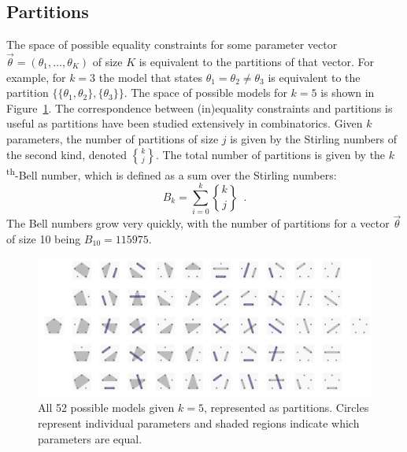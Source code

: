 \documentclass[11pt,a4paper]{article}
\theoremstyle{definition} %
\theoremstyle{case}
\DeclareRobustCommand{\stirling}{\genfrac\{\}{0pt}{}}
\newcommand{\bellnum}[1]{B_{#1}}
\begin{document}
\subsection{Partitions}
The space of possible equality constraints for some parameter vector $\vec{\theta} = (\theta_1, \ldots, \theta_K)$ of size $K$ is equivalent to the partitions of that vector. For example, for $k = 3$ the model that states $\theta_1 = \theta_2 \neq \theta_3$ is equivalent to the partition $\{\{\theta_1, \theta_2\}, \{\theta_3\}\}$. The space of possible models for $k = 5$ is shown in Figure~\ref{fig:partitions}. The correspondence between (in)equality constraints and partitions is useful as partitions have been studied extensively in combinatorics. Given $k$ parameters, the number of partitions of size $j$ is given by the Stirling numbers of the second kind, denoted $\stirling{k}{j}$. The total number of partitions is given by the $k$\textsuperscript{th}-Bell number, which is defined as a sum over the Stirling numbers:
\begin{equation}
    \bellnum{k} = \sum_{i = 0}^k \stirling{k}{j} \enspace .
\end{equation}
The Bell numbers grow very quickly, with the number of partitions for a vector $\vec{\theta}$ of size 10 being $B_{10} = 115975$. %

\begin{figure}
    \centering
    \includegraphics[width = \textwidth, keepaspectratio]{figures/modelspace_5_horizontal.pdf}
    \caption{All 52 possible models given $k = 5$, represented as partitions. Circles represent individual parameters and shaded regions indicate which parameters are equal.}
    \label{fig:partitions}
\end{figure}
\end{document}

